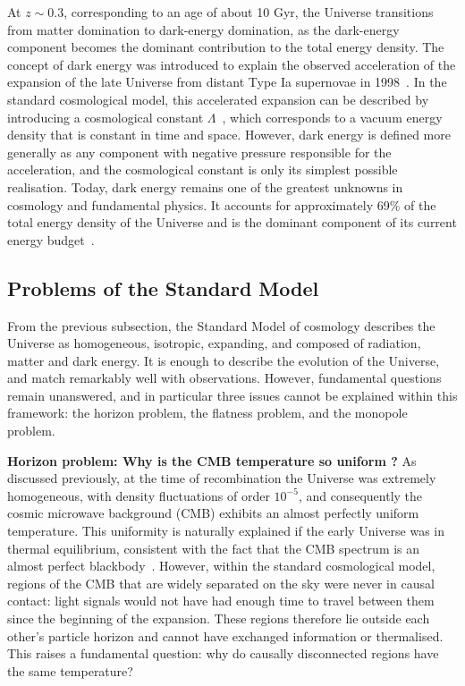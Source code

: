 \documentclass[../../thesis.tex]{subfiles}
\begin{document}
At $z \sim 0.3$, corresponding to an age of about 10 Gyr, the Universe transitions from matter domination to dark-energy domination, as the dark-energy component becomes the dominant contribution to the total energy density. The concept of dark energy was introduced to explain the observed acceleration of the expansion of the late Universe from distant Type Ia supernovae in 1998~\cite{Riess_1998,Perlmutter_1999}. In the standard cosmological model, this accelerated expansion can be described by introducing a cosmological constant $\Lambda$~\cite{peebles1984,efstathiou1990}, which corresponds to a vacuum energy density that is constant in time and space. However, dark energy is defined more generally as any component with negative pressure responsible for the acceleration, and the cosmological constant is only its simplest possible realisation.
Today, dark energy remains one of the greatest unknowns in cosmology and fundamental physics. It accounts for approximately 69\% of the total energy density of the Universe and is the dominant component of its current energy budget~\cite{DESI2024VI}.

\subsection{Problems of the Standard Model} \label{subsection:cosmo_pb}

From the previous subsection, the Standard Model of cosmology describes the Universe as homogeneous, isotropic, expanding, and composed of radiation, matter and dark energy. It is enough to describe the evolution of the Universe, and match remarkably well with observations. However, fundamental questions remain unanswered, and in particular three issues cannot be explained within this framework: the horizon problem, the flatness problem, and the monopole problem.

\textbf{Horizon problem: Why is the CMB temperature so uniform ?} As discussed previously, at the time of recombination the Universe was extremely homogeneous, with density fluctuations of order $10^{-5}$, and consequently the cosmic microwave background (CMB) exhibits an almost perfectly uniform temperature. This uniformity is naturally explained if the early Universe was in thermal equilibrium, consistent with the fact that the CMB spectrum is an almost perfect blackbody~\cite{COBE1994}.
However, within the standard cosmological model, regions of the CMB that are widely separated on the sky were never in causal contact: light signals would not have had enough time to travel between them since the beginning of the expansion. These regions therefore lie outside each other’s particle horizon and cannot have exchanged information or thermalised.
This raises a fundamental question: why do causally disconnected regions have the same temperature?
\end{document}
